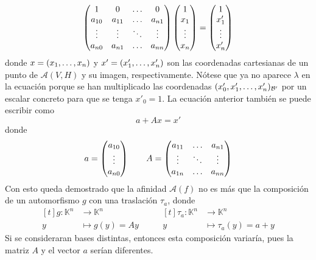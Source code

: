 \documentclass[12pt]{report}
\theoremstyle{definition}
\theoremstyle{definition}
\theoremstyle{remark}
\begin{document}
\[
\begin{pmatrix*}
    1 & 0 & \mathellipsis & 0 \\
    a_{10} & a_{11} & \mathellipsis & a_{n1} \\
    \vdots & \vdots & \ddots & \vdots \\
    a_{n0} & a_{n1} & \mathellipsis & a_{nn}
\end{pmatrix*} \begin{pmatrix*}
    1 \\
    x_1 \\
    \vdots \\
    x_n
\end{pmatrix*} = \begin{pmatrix*}
    1 \\
    x'_1 \\
    \vdots \\
    x'_n
\end{pmatrix*}
\]
donde $x = (x_1,\mathellipsis,x_n)$ y $x' = (x'_1,\mathellipsis,x'_n)$ son las coordenadas cartesianas de un punto de $\mathcal{A}(V,H)$ y su imagen, respectivamente. Nótese que ya no aparece $\lambda$ en la ecuación porque se han multiplicado las coordenadas $(x'_0,x'_1,\mathellipsis,x'_n)_{\mathcal{B'}}$ por un escalar concreto para que se tenga $x'_0 = 1$. La ecuación anterior también se puede escribir como
\[a + Ax = x'\]
donde 
\[a = \begin{pmatrix*}
    a_{10} \\
    \vdots \\
    a_{n0}
\end{pmatrix*} \qquad A = \begin{pmatrix*}
a_{11} & \mathellipsis & a_{n1} \\
\vdots & \ddots & \vdots \\
a_{1n} & \mathellipsis & a_{nn}
\end{pmatrix*}\]
Con esto queda demostrado que la afinidad $\mathcal{A}(f)$ no es más que la composición de un automorfismo $g$ con una traslación $\tau_a$, donde
\begin{equation*}
\begin{aligned}[t]
g \colon \mathbb{K}^n &\longrightarrow \mathbb{K}^n \\
y &\longmapsto g(y) = Ay
\end{aligned}
\qquad
\begin{aligned}[t]
\tau_a \colon \mathbb{K}^n &\longrightarrow \mathbb{K}^n \\
y &\longmapsto \tau_a(y) = a+y
\end{aligned}
\end{equation*}
Si se consideraran bases distintas, entonces esta composición variaría, pues la matriz $A$ y el vector $a$ serían diferentes.
\end{document}
